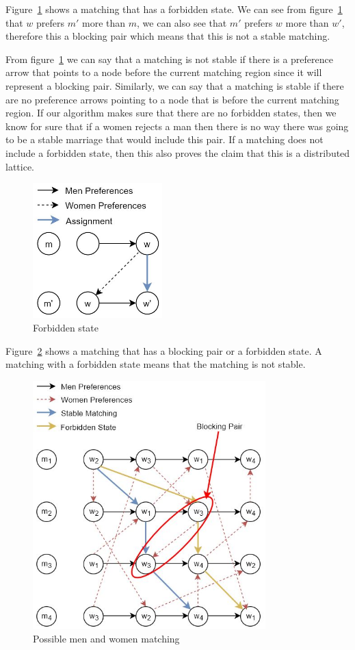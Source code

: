 \documentclass[twoside]{article}
\begin{document}
Figure~\ref{fig:forbiddenState} shows a matching that has a forbidden state. We can see from figure~\ref{fig:forbiddenState} that $w$ prefers $m'$ more than $m$, we can also see that $m'$ prefers $w$ more than $w'$, therefore this a blocking pair which means that this is not a stable matching.

From figure~\ref{fig:forbiddenState} we can say that a matching is not stable if there is a preference arrow that points to a node before the current matching region since it will represent a blocking pair. Similarly, we can say that a matching is stable if there are no preference arrows pointing to a node that is before the current matching region. If our algorithm makes sure that there are no forbidden states, then we know for sure that if a women rejects a man then there is no way there was going to be a stable marriage that would include this pair. If a matching does not include a forbidden state, then this also proves the claim that this is a distributed lattice.

\begin{figure}[htp]
\centering
\includegraphics[width=5cm]{ForbiddenStateExample.JPG}
\caption{Forbidden state}
\label{fig:forbiddenState}
\end{figure}

Figure~\ref{fig:PossibleStableMatchingsWithForbiddenMatching} shows a matching that has a blocking pair or a forbidden state. A matching with a forbidden state means that the matching is not stable.

\begin{figure}[htp]
\centering
\includegraphics[width=9cm]{PossibleStableMatchingsWithForbiddenMatching.JPG}
\caption{Possible men and women matching}
\label{fig:PossibleStableMatchingsWithForbiddenMatching}
\end{figure}
\end{document}
